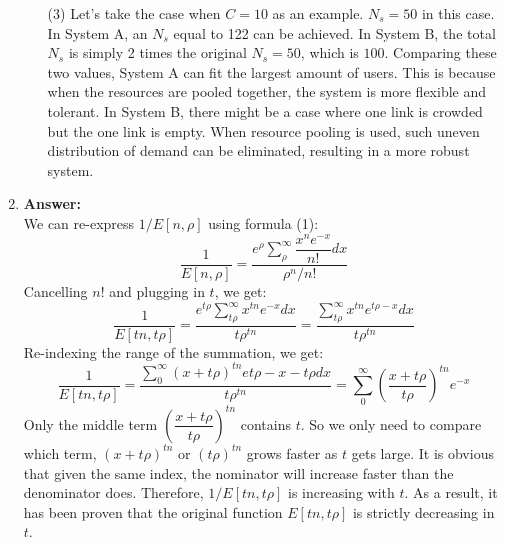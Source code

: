 \documentclass[12pt]{article}
\begin{document}
\begin{enumerate}
\begin{itemize}
\item[(3)]Let's take the case when $C=10$ as an example. $N_s=50$ in this case. 
\medskip\\
In System A, an $N_s$ equal to 122 can be achieved. In System B, the total $N_s$ is simply 2 times the original $N_s=50$, which is $100$. Comparing these two values, System A can fit the largest amount of users. This is because when the resources are pooled together, the system is more flexible and tolerant. In System B, there might be a case where one link is crowded but the one link is empty. When resource pooling is used, such uneven distribution of demand can be eliminated, resulting in a more robust system.
\end{itemize}
\item{} \textbf{Answer:}
\medskip\\
We can re-express $1/E[n,\rho]$ using formula (1):
$$\dfrac{1}{E[n,\rho]}=\dfrac{e^\rho\sum_\rho^\infty\dfrac{x^ne^{-x}}{n!}dx}{\rho^n/n!}$$
Cancelling $n!$ and plugging in $t$, we get:
$$\dfrac{1}{E[tn,t\rho]}=\dfrac{e^{t\rho}\sum_{t\rho}^\infty x^{tn}e^{-x}dx}{t\rho^{tn}}=\dfrac{\sum_{t\rho}^\infty x^{tn}e^{t\rho-x}dx}{t\rho^{tn}}$$
Re-indexing the range of the summation, we get:
$$\dfrac{1}{E[tn,t\rho]}=\dfrac{\sum_0^\infty(x+t\rho)^{tn}e{t\rho-x-t\rho}dx}{t\rho^{tn}}=\sum_0^\infty(\dfrac{x+t\rho}{t\rho})^{tn}e^{-x}$$
Only the middle term $(\dfrac{x+t\rho}{t\rho})^{tn}$ contains $t$. So we only need to compare which term, $(x+t\rho)^{tn}$ or $(t\rho)^{tn}$ grows faster as $t$ gets large. It is obvious that given the same index, the nominator will increase faster than the denominator does. Therefore, $1/E[tn,t\rho]$ is increasing with $t$. As a result, it has been proven that the original function $E[tn,t\rho]$ is strictly decreasing in $t$.


\end{enumerate}
\end{document}
